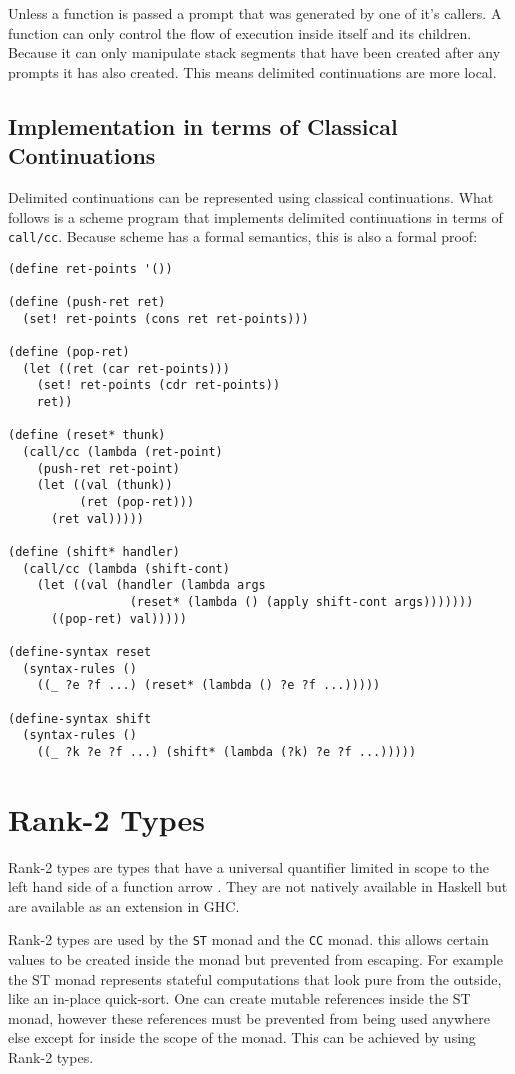 \documentclass[]{article}
\newcommand{\function}[1]{\texttt{#1}}
\newcommand{\type}[1]{\texttt{#1}}
\begin{document}
Unless a function is passed a prompt that was generated by one of it's
callers. A function can only control the flow of execution inside itself and
its children. Because it can only manipulate stack segments that have been
created after any prompts it has also created. This means delimited
continuations are more local.

\subsection{Implementation in terms of Classical Continuations}
Delimited continuations can be represented using classical continuations. What
follows is a scheme program that implements delimited continuations in terms
of \function{call/cc}. Because scheme has a formal semantics, this is also a
formal proof:

\begin{verbatim}
(define ret-points '())

(define (push-ret ret)
  (set! ret-points (cons ret ret-points)))

(define (pop-ret)
  (let ((ret (car ret-points)))
    (set! ret-points (cdr ret-points))
    ret))

(define (reset* thunk)
  (call/cc (lambda (ret-point)
    (push-ret ret-point)
    (let ((val (thunk))
          (ret (pop-ret)))
      (ret val)))))

(define (shift* handler)
  (call/cc (lambda (shift-cont)
    (let ((val (handler (lambda args
                 (reset* (lambda () (apply shift-cont args)))))))
      ((pop-ret) val)))))

(define-syntax reset
  (syntax-rules ()
    ((_ ?e ?f ...) (reset* (lambda () ?e ?f ...)))))

(define-syntax shift
  (syntax-rules ()
    ((_ ?k ?e ?f ...) (shift* (lambda (?k) ?e ?f ...)))))
\end{verbatim}

\section{Rank-2 Types}
\label{discussion:rank2}

Rank-2 types are types that have a universal quantifier limited in scope to
the left hand side of a function arrow \cite{Wikibook:Haskell}. They are not
natively available in Haskell but are available as an extension in GHC.

Rank-2 types are used by the \type{ST} monad and the \type{CC} monad. this
allows certain values to be created inside the monad but prevented from
escaping. For example the ST monad represents stateful computations that look
pure from the outside, like an in-place quick-sort. One can create mutable
references inside the ST monad, however these references must be prevented
from being used anywhere else except for inside the scope of the monad.
This can be achieved by using Rank-2 types.
\end{document}
